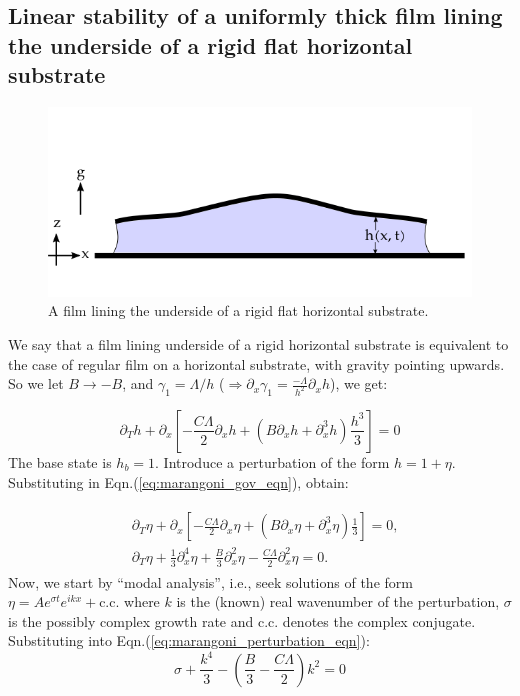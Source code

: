 \documentclass{article}
\begin{document}
\subsection*{Linear stability of a uniformly thick film lining the underside of a rigid flat horizontal substrate}
\begin{figure}[H]
    \centering
    \includegraphics[scale = 0.5]{Figs/marangoni.png}
    \caption{A film lining the underside of a rigid flat horizontal substrate.}
    \label{fig:marangoni_underside}
\end{figure}

We say that a film lining underside of a rigid horizontal substrate is equivalent to the case of regular film on a horizontal substrate, with gravity pointing upwards. So we let $B\rightarrow -B$, and $\gamma_{1} = \Lambda/h$ ($\Rightarrow \partial_{x}\gamma_{1} = \frac{-\Lambda}{h^{2}} \partial_{x}h$), we get:

\begin{equation}\label{eq:marangoni_gov_eqn}
 \partial_{T}h + \partial_{x}\left[-\frac{C\Lambda}{2} \partial_{x}h + \left( B\partial_{x}h + \partial_{x}^{3} h \right) \frac{h^{3}}{3}  \right] = 0
\end{equation}
The base state is $h_{b} = 1$. Introduce a perturbation of the form $h = 1 + \eta$. Substituting in Eqn.(\ref{eq:marangoni_gov_eqn}), obtain:

\begin{align}\label{eq:marangoni_perturbation_eqn}
 \begin{split}
  &\partial_{T}\eta + \partial_{x}\left[-\frac{C\Lambda}{2} \partial_{x}\eta + \left( B\partial_{x}\eta + \partial_{x}^{3} \eta \right) \frac{1}{3}  \right] = 0,\\
  &\partial_{T}\eta + \frac{1}{3}\partial^{4}_{x}\eta + \frac{B}{3} \partial^{2}_{x}\eta - \frac{C\Lambda}{2}\partial^{2}_{x}\eta = 0.
 \end{split}
\end{align}
Now, we start by ``modal analysis'', i.e., seek solutions of the form $\eta = A e^{\sigma t} e^{ikx} + \textrm{c.c.}$ where $k$ is the (known) real wavenumber of the perturbation, $\sigma$ is the possibly complex growth rate and c.c. denotes the complex conjugate. Substituting into Eqn.(\ref{eq:marangoni_perturbation_eqn}):
\begin{equation}
 \sigma + \frac{k^{4}}{3} - \left(\frac{B}{3} -\frac{C\Lambda}{2}\right) k^{2} = 0
\end{equation}
\end{document}
